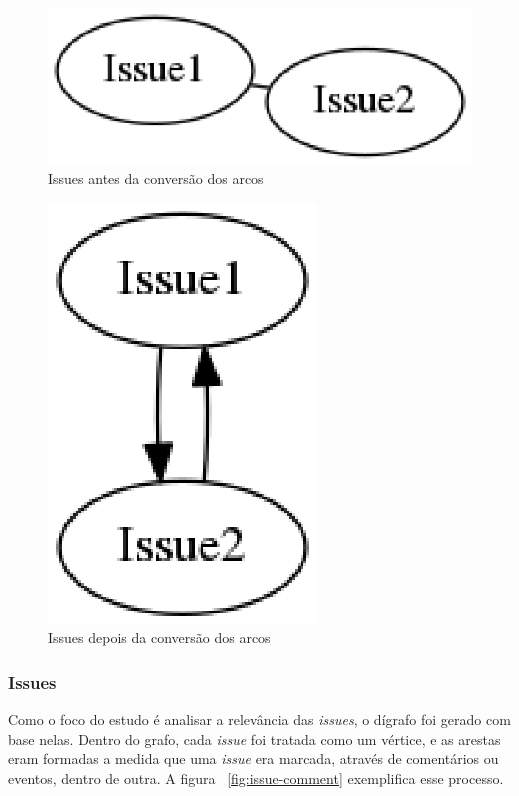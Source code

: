 \begin{figure}[h]
    \centering
        \includegraphics[keepaspectratio=true,scale=0.5]{figuras/undirected.eps}
    \caption{Issues antes da conversão dos arcos}
    \label{fig:undirected}
\end{figure}

\begin{figure}[h]
    \centering
        \includegraphics[keepaspectratio=true,scale=0.5]{figuras/directed.eps}
    \caption{Issues depois da conversão dos arcos}
    \label{fig:directed}
\end{figure}

\newpage
\subsubsection{Issues}
\label{est:ran:iss}

Como o foco do estudo é analisar a relevância das \textit{issues}, o dígrafo 
foi gerado com base nelas. Dentro do grafo, cada \textit{issue} foi tratada
como um vértice, e as arestas eram formadas a medida que uma \textit{issue}
era marcada, através de comentários ou eventos, dentro de outra. A figura
~\ref{fig:issue-comment} exemplifica esse processo.

